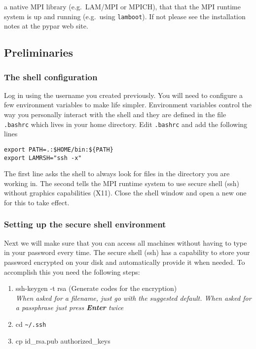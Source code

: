         
a native MPI library (e.g.\ LAM/MPI or MPICH),
that
that the MPI runtime system is up and running (e.g.\ using \texttt{lamboot}).
If not please see the installation notes at the pypar web site.



\subsection*{Preliminaries}

\subsubsection*{The shell configuration}
Log in using the username you created previously.
You will need to configure a few environment variables to make
life simpler.
Environment variables control the way you personally interact with the
shell and they are defined in the file \texttt{.bashrc} which lives in
your home directory. Edit \texttt{.bashrc} and add the following lines

\begin{verbatim}
export PATH=.:$HOME/bin:${PATH}
export LAMRSH="ssh -x"
\end{verbatim}

The first line asks the shell to always look for files in the directory
you are working in. The second tells the MPI runtime system to use
secure shell (ssh) without graphics capabilities (X11).
Close the shell window and open a new one for this to take effect.

\subsubsection*{Setting up the secure shell environment}

Next we will make sure that you can access all machines without having to
type in your password every time. The secure shell (ssh) has a capability
to store your password encrypted on your disk and automatically provide
it when needed. To accomplish this you need the following steps:

\begin{enumerate}
  \item ssh-keygen -t rsa (Generate codes for the encryption)\\
  \emph{When asked for a filename, just go with the suggested default.
  When asked for a passphrase just press \textbf{Enter} twice}
  \item cd \verb+~/.ssh+
  \item cp id\_rsa.pub authorized\_keys
\end{enumerate}

